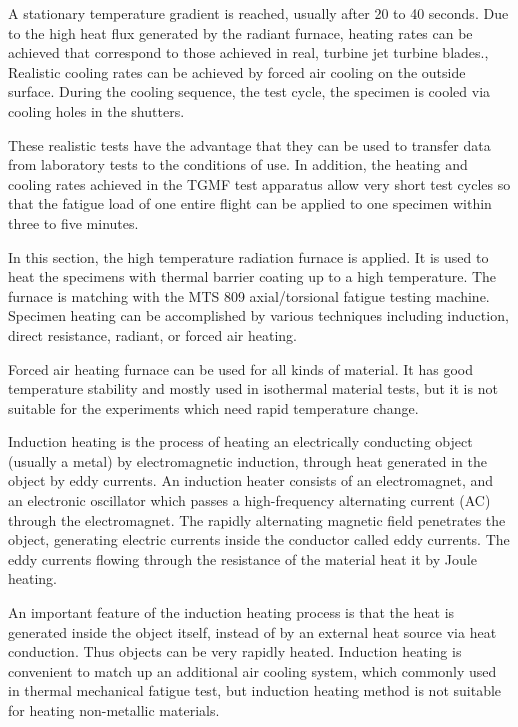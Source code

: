 A stationary temperature gradient is reached, usually after 20 to 40 seconds. Due to the high heat flux generated by the radiant furnace, heating rates can be achieved that correspond to those achieved in real, turbine jet turbine blades., Realistic cooling rates can be achieved by forced air cooling on the outside surface. During the cooling sequence, the test cycle, the specimen is cooled via cooling holes in the shutters.

These realistic tests have the advantage that they can be used to transfer data from laboratory tests to the conditions of use. In addition, the heating and cooling rates achieved in the TGMF test apparatus allow very short test cycles so that the fatigue load of one entire flight can be applied to one specimen within three to five minutes.



In this section, the high temperature radiation furnace is applied.
It is used to heat the specimens with thermal barrier coating up to a high temperature.
The furnace is matching with the MTS 809 axial/torsional fatigue testing machine.
Specimen heating can be accomplished by various techniques including induction, direct resistance, radiant, or forced air heating.

Forced air heating furnace can be used for all kinds of material. It has good temperature stability and mostly used in isothermal material tests, but it is not suitable for the experiments which need rapid temperature change.

Induction heating is the process of heating an electrically conducting object (usually a metal) by electromagnetic induction, through heat generated in the object by eddy currents. An induction heater consists of an electromagnet, and an electronic oscillator which passes a high-frequency alternating current (AC) through the electromagnet. The rapidly alternating magnetic field penetrates the object, generating electric currents inside the conductor called eddy currents. The eddy currents flowing through the resistance of the material heat it by Joule heating.

An important feature of the induction heating process is that the heat is generated inside the object itself, instead of by an external heat source via heat conduction. Thus objects can be very rapidly heated.
Induction heating is convenient to match up an additional air cooling system, which commonly used in thermal mechanical fatigue test, but induction heating method is not suitable for heating non-metallic materials.




